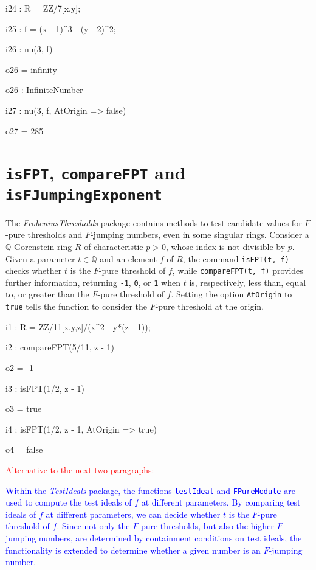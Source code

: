 \documentclass{amsart}
\begin{document}
\smallskip
{\small
{}
\begin{MyVerbatim}
i24 : R = ZZ/7[x,y];

i25 : f = (x - 1)^3 - (y - 2)^2;

i26 : nu(3, f)

o26 = infinity

o26 : InfiniteNumber

i27 : nu(3, f, AtOrigin => false)

o27 = 285
\end{MyVerbatim}
}

\section{{\tt isFPT}, {\tt compareFPT} and {\tt isFJumpingExponent}}
\label{sec.IsFPT}

The \emph{FrobeniusThresholds} package contains methods to test candidate values for $F$-pure thresholds and $F$-jumping numbers, even in some singular rings.
Consider a  $\mathbb{Q}$-Gorenstein ring $R$ of characteristic $p>0$, whose index is not divisible by $p$.
Given a parameter $t\in \mathbb{Q}$ and an element $f$ of $R$, the command \texttt{isFPT(t, f)} checks whether $t$ is the $F$-pure threshold of $f$, while \texttt{compareFPT(t, f)} provides further information, returning {\tt-1}, \texttt{0}, or \texttt{1} when $t$ is, respectively, less than, equal to, or greater than the $F$-pure threshold of $f$.  Setting the option \texttt{AtOrigin} to \texttt{true} tells the function to consider the $F$-pure threshold at the origin.  %

\smallskip
{\small
{}
\begin{MyVerbatim}
i1 : R = ZZ/11[x,y,z]/(x^2 - y*(z - 1));

i2 : compareFPT(5/11, z - 1)

o2 = -1

i3 : isFPT(1/2, z - 1)

o3 = true

i4 : isFPT(1/2, z - 1, AtOrigin => true)

o4 = false
\end{MyVerbatim}
}
\smallskip

\noindent \textcolor{red}{Alternative to the next two paragraphs:}

\textcolor{blue}{Within the \emph{TestIdeals} package, the functions \texttt{testIdeal} and \texttt{FPureModule} are used to compute the test ideals of $f$ at different parameters.
By comparing test ideals of $f$ at different parameters, we can decide  whether $t$ is the $F$-pure threshold of $f$. 
Since not only the $F$-pure thresholds, but also the higher $F$-jumping numbers, are determined by containment conditions on test ideals, the functionality is extended to determine whether a given number is an $F$-jumping number.}
\end{document}
